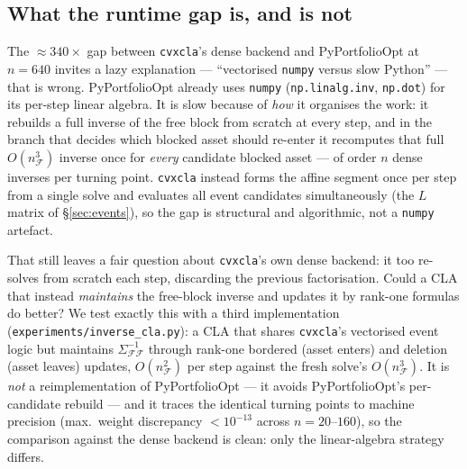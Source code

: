 \documentclass[11pt]{article}
\newcommand{\Sig}{\Sigma}
\newcommand{\F}{\mathcal{F}}        %
\newcommand{\inv}{^{-1}}
\begin{document}
\subsection{What the runtime gap is, and is not}
\label{sec:baseline}

The $\approx 340\times$ gap between \texttt{cvxcla}'s dense backend and
PyPortfolioOpt at $n=640$ invites a lazy explanation --- ``vectorised
\texttt{numpy} versus slow Python'' --- that is wrong. PyPortfolioOpt already uses
\texttt{numpy} (\texttt{np.linalg.inv}, \texttt{np.dot}) for its per-step linear
algebra. It is slow because of \emph{how} it organises the work: it rebuilds a full
inverse of the free block from scratch at every step, and in the branch that
decides which blocked asset should re-enter it recomputes that full $O(n_\F^3)$
inverse once for \emph{every} candidate blocked asset --- of order $n$ dense
inverses per turning point. \texttt{cvxcla} instead forms the affine segment once
per step from a single solve and evaluates all event candidates simultaneously
(the $L$ matrix of \S\ref{sec:events}), so the gap is structural and algorithmic,
not a \texttt{numpy} artefact.

That still leaves a fair question about \texttt{cvxcla}'s own dense backend: it too
re-solves from scratch each step, discarding the previous factorisation. Could a
CLA that instead \emph{maintains} the free-block inverse and updates it by
rank-one formulas do better? We test exactly this with a third implementation
(\texttt{experiments/inverse\_cla.py}): a CLA that shares \texttt{cvxcla}'s
vectorised event logic but maintains $\Sig_{\F\F}\inv$ through rank-one bordered
(asset enters) and deletion (asset leaves) updates, $O(n_\F^2)$ per step against
the fresh solve's $O(n_\F^3)$. It is \emph{not} a reimplementation of
PyPortfolioOpt --- it avoids PyPortfolioOpt's per-candidate rebuild --- and it
traces the identical turning points to machine precision (max.\ weight discrepancy
$<10^{-13}$ across $n=20$--$160$), so the comparison against the dense backend is
clean: only the linear-algebra strategy differs.
\end{document}
